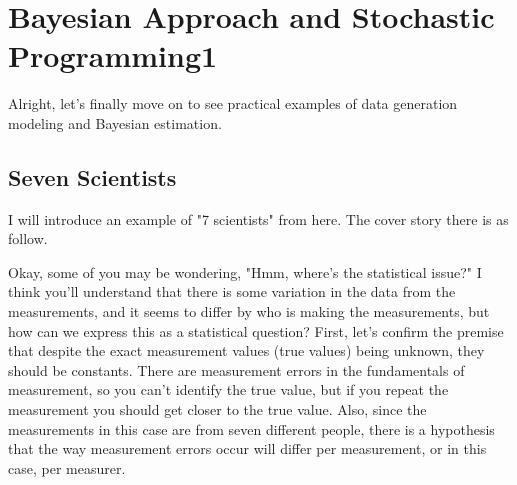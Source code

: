 \documentclass{ltjsbook}
\begin{document}
\chapter{Bayesian Approach and Stochastic Programming1}
Alright, let's finally move on to see practical examples of data generation modeling and Bayesian estimation.
\label{x18_MCMC}
\section{Seven Scientists}
I will introduce an example of "7 scientists" from \textcite{Lee201709} here. The cover story there is as follow.



Okay, some of you may be wondering, "Hmm, where's the statistical issue?" I think you'll understand that there is some variation in the data from the measurements, and it seems to differ by who is making the measurements, but how can we express this as a statistical question? First, let's confirm the premise that despite the exact measurement values (true values) being unknown, they should be constants. There are measurement errors in the fundamentals of measurement, so you can't identify the true value, but if you repeat the measurement you should get closer to the true value. Also, since the measurements in this case are from seven different people, there is a hypothesis that the way measurement errors occur will differ per measurement, or in this case, per measurer.
\end{document}
